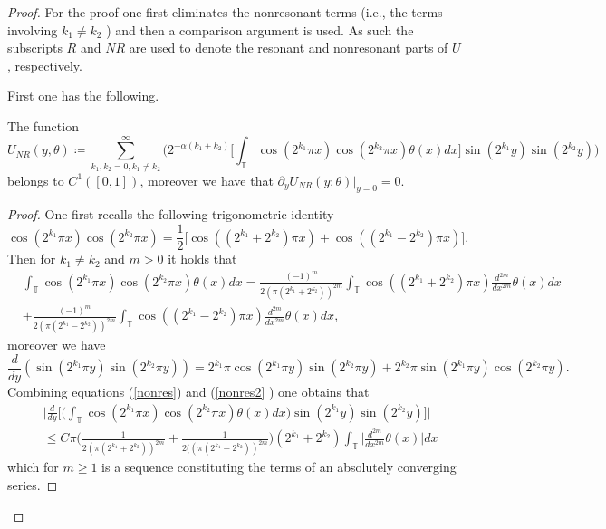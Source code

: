 \documentclass[10pt,a4paper]{amsart}
\def \del {\partial}
\begin{document}
\begin{proof}
For the proof one first eliminates the nonresonant terms (i.e., the terms involving $k_1\not=k_2$ ) and then a comparison argument is used. As such the subscripts $R$ and $NR$ are used to denote the resonant and nonresonant parts of $U$, respectively.

First one has the following.
\begin{lemma}
The function
\begin{equation}
U_{NR} (y,\theta) \coloneqq \sum_{k_1,k_2 = 0,k_1\not=k_2}^\infty \bigg(2^{-\alpha (k_1 + k_2)} \bigg[ \int_{\mathbb{T}} \cos(2^{k_1}  \pi x )  \cos(2^{k_2}  \pi x)\theta (x) dx \bigg] \sin(2^{k_1}y)  \sin(2^{k_2} y)  \bigg)
\end{equation}
belongs to $C^1([0,1])$, moreover we have that $\del_y U_{NR} (y;\theta) \lvert_{y=0} =0$.
\end{lemma}
\begin{proof}
One first recalls the following trigonometric identity
\begin{equation*}
\cos(2^{k_1}  \pi x)  \cos(2^{k_2} \pi x)=\frac12 \bigg[\cos((2^{k_1}+ 2^{k_2})  \pi x) +\cos((2^{k_1}- 2^{k_2}) \pi x)\bigg].
\end{equation*}
Then for $k_1 \neq k_2$ and $m > 0$ it holds that
\begin{equation} \label{nonres}
\begin{aligned}
&\int_{\mathbb{T}} \cos(2^{k_1}  \pi x)  \cos(2^{k_2}  \pi x)\theta (x) dx=\frac{(-1)^{m}}{2( \pi( 2^{k_1}+ 2^{k_2}))^{2m} } \int_{\mathbb{T}}  \cos((2^{k_1}+ 2^{k_2}) \pi x) \frac{d^{2m}}{dx^{2m}}\theta(x) dx\\
&+\frac{(-1)^{m}}{2(\pi(2^{k_1}- 2^{k_2}))^{2m} } \int_{\mathbb{T}} \cos((2^{k_1}- 2^{k_2}) \pi x) \frac{d^{2m}}{dx^{2m}}\theta(x) dx,
\end{aligned}
\end{equation}
moreover we have
\begin{equation}\label{nonres2}
\frac{d}{dy} ( \sin(2^{k_1} \pi y)  \sin(2^{k_2} \pi y) )= 2^{k_1} \pi \cos(2^{k_1} \pi y)  \sin(2^{k_2} \pi y) + 2^{k_2} \pi \sin(2^{k_1} \pi y)  \cos(2^{k_2} \pi y).
\end{equation}
Combining equations (\ref{nonres}) and (\ref{nonres2} ) one obtains that
\begin{equation}
\begin{aligned}
&\bigg\lvert\frac{d}{dy} \bigg[ \bigg( \int_{\mathbb{T}} \cos(2^{k_1}\pi x)  \cos(2^{k_2}\pi x)\theta (x) dx \bigg)  \sin(2^{k_1}y)  \sin(2^{k_2} y) \bigg] \bigg\rvert\\
&\le C \pi \bigg( \frac 1{2(\pi (2^{k_1}+ 2^{k_2}))^{2m} } +
   \frac 1{2((\pi(2^{k_1}- 2^{k_2}))^{2m} } \bigg) (2^{k_1} + 2^{k_2} )\int_{\mathbb{T}} \bigg\lvert\frac{d^{2m}}{dx^{2m}} \theta(x)\bigg\rvert dx 
\end{aligned}
 \end{equation}
which for $m \geq 1$ is a sequence constituting the terms of an absolutely converging series.


\end{proof}
\end{proof}
\end{document}
